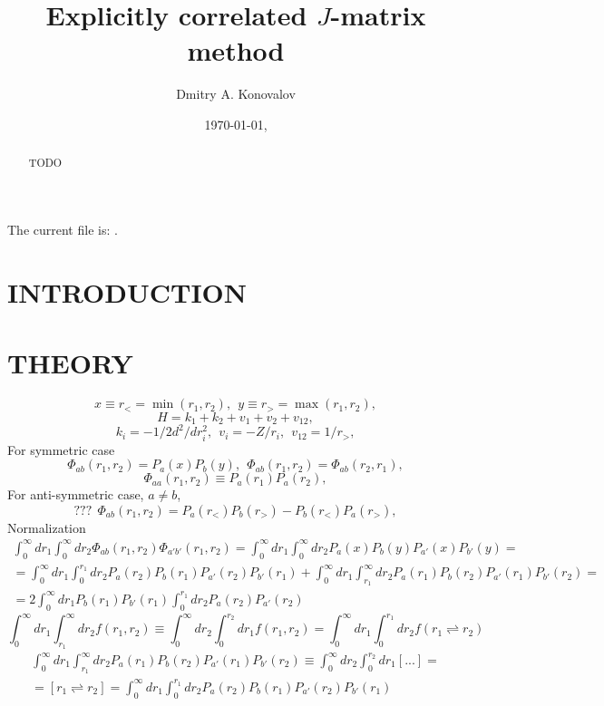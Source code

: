 \documentclass[aip
, pra
, showpacs
, aps
, onecolumn
, groupedaddress
, floatfix
]{revtex4}
\newcommand{\beq}{\begin{equation}}
\newcommand{\eeq}{\end{equation}}
\newcommand{\barr}{\begin{array}}
\newcommand{\earr}{\end{array}}
\begin{document}
\fontsize{12}{15}

\title {Explicitly correlated $J$-matrix method}

\author{Dmitry A. Konovalov}

\date{\today, \currenttime}

\begin{abstract}
TODO

\end{abstract}

\maketitle
The current file is: \currfilename.

\section{INTRODUCTION}

\section{THEORY}
\beq
x \equiv r_< = \min(r_1, r_2), \ \ y \equiv r_> = \max(r_1, r_2),
\eeq
\beq
H = k_1 + k_2 + v_1 + v_2 + v_{12},
\eeq
\beq
k_i = -1/2 d^2/dr^2_i, \ \ v_i = - Z/r_i, \ \ v_{12} = 1/r_>,
\eeq
For symmetric case
\beq
\Phi_{ab}(r_1, r_2) = P_a(x) P_b(y), \ \ \Phi_{ab}(r_1, r_2) = \Phi_{ab}(r_2, r_1),
\eeq
\beq
\Phi_{aa}(r_1, r_2) \equiv P_a(r_1) P_a(r_2),
\eeq
For anti-symmetric case, $a \neq b$,
\beq
??? \ \  \Phi_{ab}(r_1, r_2) = P_a(r_<) P_b(r_>) - P_b(r_<) P_a(r_>),
\eeq
Normalization
\beq \barr{l}
\int_0^\infty dr_1 \int_0^\infty dr_2 \Phi_{ab}(r_1, r_2) \Phi_{a'b'}(r_1, r_2)
=\int_0^\infty dr_1 \int_0^\infty dr_2 P_a(x) P_b(y) P_{a'}(x)  P_{b'}(y)=\\
= \int_0^\infty dr_1  \int_0^{r_1} dr_2 P_a(r_2) P_b(r_1) P_{a'}(r_2) P_{b'}(r_1)
+\int_0^\infty dr_1  \int_{r_1}^\infty dr_2 P_a(r_1) P_b(r_2) P_{a'}(r_1) P_{b'}(r_2)  =\\
= 2 \int_0^\infty dr_1  P_b(r_1) P_{b'}(r_1) \int_0^{r_1} dr_2 P_a(r_2) P_{a'}(r_2)
\earr \eeq
\beq
\int_0^\infty dr_1  \int_{r_1}^\infty dr_2 f(r_1, r_2) \equiv \int_0^\infty dr_2  \int_0^{r_2} dr_1 f(r_1, r_2)
= \int_0^\infty dr_1  \int_0^{r_1} dr_2 f(r_1 \rightleftharpoons r_2)
\eeq
\beq \barr{l}
\int_0^\infty dr_1  \int_{r_1}^\infty dr_2 P_a(r_1) P_b(r_2) P_{a'}(r_1) P_{b'}(r_2)
\equiv \int_0^\infty dr_2  \int_0^{r_2} dr_1 [...] =\\
= [r_1 \rightleftharpoons r_2]
=\int_0^\infty dr_1  \int_0^{r_1} dr_2 P_a(r_2) P_b(r_1) P_{a'}(r_2) P_{b'}(r_1)
\earr \eeq
\end{document}
